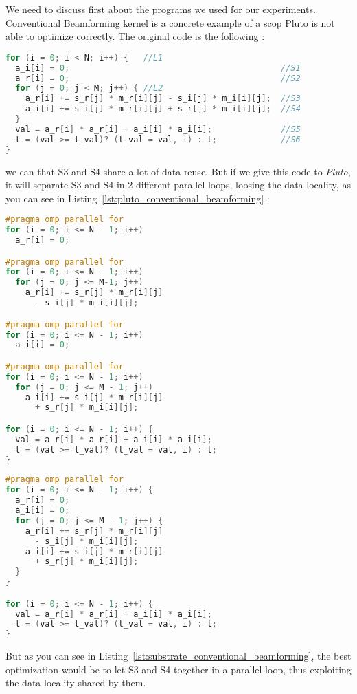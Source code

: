 \documentclass[paper=a4, fontsize=11.5pt]{scrartcl}
\numberwithin{equation}{section}        %
\numberwithin{figure}{section}          %
\numberwithin{table}{section}               %
\begin{document}
We need to discuss first about the programs we used for our experiments.
Conventional Beamforming kernel is a concrete example of a scop Pluto is not able
to optimize correctly. The original code is the following :
\begin{lstlisting}[frame=single, language=C, caption={Origin Conventional Beamforming Kernel}, label={lst:original_conventional_beamforming}]
for (i = 0; i < N; i++) {   //L1
  a_i[i] = 0;                                           //S1
  a_r[i] = 0;                                           //S2
  for (j = 0; j < M; j++) { //L2
    a_r[i] += s_r[j] * m_r[i][j] - s_i[j] * m_i[i][j];  //S3
    a_i[i] += s_i[j] * m_r[i][j] + s_r[j] * m_i[i][j];  //S4
  }
  val = a_r[i] * a_r[i] + a_i[i] * a_i[i];              //S5
  t = (val >= t_val)? (t_val = val, i) : t;             //S6
}
\end{lstlisting}
we can that S3 and S4 share a lot of data reuse. But if we give this code to \textit{Pluto},
it will separate S3 and S4 in 2 different parallel loops, loosing the data locality, as you
can see in Listing~\ref{lst:pluto_conventional_beamforming} :
\begin{minipage}[t]{0.45\textwidth}
\begin{lstlisting}[frame=single, language=C, basicstyle=\scriptsize, caption={Conventional Beamforming Kernel Optimized by Pluto}, label={lst:pluto_conventional_beamforming}]
#pragma omp parallel for
for (i = 0; i <= N - 1; i++)
  a_r[i] = 0;

#pragma omp parallel for
for (i = 0; i <= N - 1; i++)
  for (j = 0; j <= M-1; j++)
    a_r[i] += s_r[j] * m_r[i][j]
      - s_i[j] * m_i[i][j];

#pragma omp parallel for
for (i = 0; i <= N - 1; i++)
  a_i[i] = 0;

#pragma omp parallel for
for (i = 0; i <= N - 1; i++)
  for (j = 0; j <= M - 1; j++)
    a_i[i] += s_i[j] * m_r[i][j]
      + s_r[j] * m_i[i][j];

for (i = 0; i <= N - 1; i++) {
  val = a_r[i] * a_r[i] + a_i[i] * a_i[i];
  t = (val >= t_val)? (t_val = val, i) : t;
}
\end{lstlisting}
\end{minipage}
\hfill
\begin{minipage}[t]{0.45\textwidth}
\begin{lstlisting}[frame=single, language=C, basicstyle=\scriptsize, caption={Goal Version of Conventional Beamforming Kernel}, label={lst:substrate_conventional_beamforming}]
#pragma omp parallel for
for (i = 0; i <= N - 1; i++) {
  a_r[i] = 0;
  a_i[i] = 0;
  for (j = 0; j <= M - 1; j++) {
    a_r[i] += s_r[j] * m_r[i][j]
      - s_i[j] * m_i[i][j];
    a_i[i] += s_i[j] * m_r[i][j]
      + s_r[j] * m_i[i][j];
  }
}

for (i = 0; i <= N - 1; i++) {
  val = a_r[i] * a_r[i] + a_i[i] * a_i[i];
  t = (val >= t_val)? (t_val = val, i) : t;
}
\end{lstlisting}
\end{minipage}
But as you can see in Listing~\ref{lst:substrate_conventional_beamforming}, the best optimization
would be to let S3 and S4 together in a parallel loop, thus exploiting the data locality
shared by them.
\end{document}

